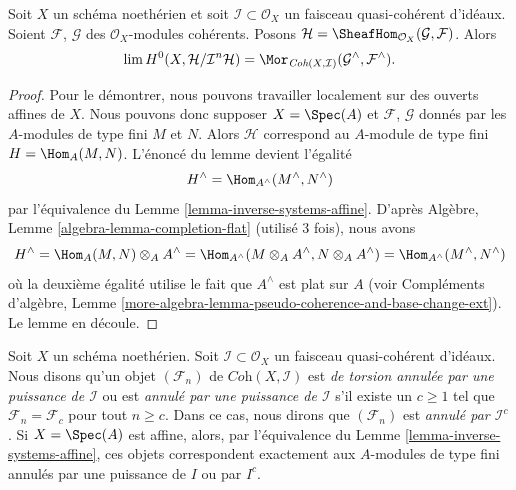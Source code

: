 \begin{lemma}
\label{lemma-completion-internal-hom}
Soit $X$ un schéma noethérien et soit $\mathcal{I} \subset \mathcal{O}_X$
un faisceau quasi-cohérent d'idéaux. Soient $\mathcal{F}$, $\mathcal{G}$ des
$\mathcal{O}_X$-modules cohérents. Posons
$\mathcal{H} = \SheafHom_{\mathcal{O}_X}(\mathcal{G}, \mathcal{F})$.
Alors
$$
\lim H^0(X, \mathcal{H}/\mathcal{I}^n\mathcal{H}) =
\Mor_{\textit{Coh}(X, \mathcal{I})}
(\mathcal{G}^\wedge, \mathcal{F}^\wedge).
$$
\end{lemma}

\begin{proof}
Pour le démontrer, nous pouvons travailler localement sur des ouverts affines de $X$.
Nous pouvons donc supposer $X = \Spec(A)$ et $\mathcal{F}$, $\mathcal{G}$
donnés par les $A$-modules de type fini $M$ et $N$. Alors $\mathcal{H}$
correspond au $A$-module de type fini $H = \Hom_A(M, N)$.
L'énoncé du lemme devient l'égalité
$$
H^\wedge = \Hom_{A^\wedge}(M^\wedge, N^\wedge)
$$
par l'équivalence du Lemme \ref{lemma-inverse-systems-affine}.
D'après Algèbre, Lemme \ref{algebra-lemma-completion-flat}
(utilisé 3 fois), nous avons
$$
H^\wedge = \Hom_A(M, N) \otimes_A A^\wedge =
\Hom_{A^\wedge}(M \otimes_A A^\wedge, N \otimes_A A^\wedge) =
\Hom_{A^\wedge}(M^\wedge, N^\wedge)
$$
où la deuxième égalité utilise le fait que $A^\wedge$ est plat sur $A$
(voir Compléments d'algèbre, Lemme
\ref{more-algebra-lemma-pseudo-coherence-and-base-change-ext}).
Le lemme en découle.
\end{proof}

\noindent
Soit $X$ un schéma noethérien. Soit $\mathcal{I} \subset \mathcal{O}_X$
un faisceau quasi-cohérent d'idéaux. Nous disons qu'un objet $(\mathcal{F}_n)$ de
$\textit{Coh}(X, \mathcal{I})$ est {\it de torsion annulée par une puissance de $\mathcal{I}$}
ou est {\it annulé par une puissance de $\mathcal{I}$} s'il existe
un $c \geq 1$ tel que $\mathcal{F}_n = \mathcal{F}_c$ pour tout $n \geq c$.
Dans ce cas, nous dirons que $(\mathcal{F}_n)$ est {\it annulé par
$\mathcal{I}^c$}. Si $X = \Spec(A)$ est affine, alors, par l'équivalence du
Lemme \ref{lemma-inverse-systems-affine},
ces objets correspondent exactement aux $A$-modules de type fini
annulés par une puissance de $I$ ou par $I^c$.


